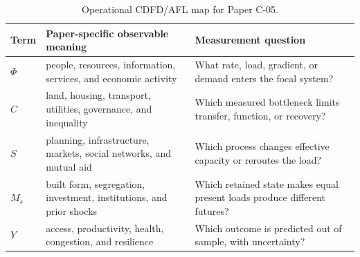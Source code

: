 \documentclass[11pt,a4paper]{article}
\begin{document}
\begin{table}[htbp]
\centering
\small
\caption{Operational CDFD/AFL map for Paper C-05.}
\begin{tabularx}{\textwidth}{|l|X|X|}
\hline
\textbf{Term} & \textbf{Paper-specific observable meaning} & \textbf{Measurement question} \\
\hline
$\Phi$ & people, resources, information, services, and economic activity & What rate, load, gradient, or demand enters the focal system? \\
\hline
$C$ & land, housing, transport, utilities, governance, and inequality & Which measured bottleneck limits transfer, function, or recovery? \\
\hline
$S$ & planning, infrastructure, markets, social networks, and mutual aid & Which process changes effective capacity or reroutes the load? \\
\hline
$M_s$ & built form, segregation, investment, institutions, and prior shocks & Which retained state makes equal present loads produce different futures? \\
\hline
$Y$ & access, productivity, health, congestion, and resilience & Which outcome is predicted out of sample, with uncertainty? \\
\hline
\end{tabularx}
\end{table}
\end{document}
